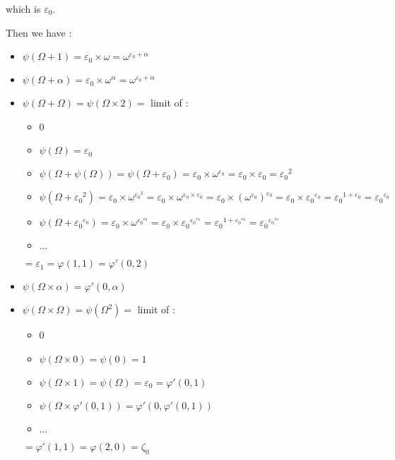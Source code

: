 \documentclass[10pt]{article}
\begin{document}
which is \( \varepsilon_0 \).

Then we have : 

\begin{itemize}
     \setlength{\itemsep}{1pt}
     \setlength{\parskip}{0pt}
     \setlength{\parsep}{0pt}

\item \( \psi(\Omega+1) = \varepsilon_0 \times \omega = \omega^{\varepsilon_0+\alpha} \)

\item \( \psi(\Omega+\alpha) = \varepsilon_0 \times \omega^\alpha = \omega^{\varepsilon_0+\alpha} \)

\item \( \psi(\Omega+\Omega) = \psi(\Omega \times 2) = \) limit of : 
   \begin{itemize}
     \setlength{\itemsep}{1pt}
     \setlength{\parskip}{0pt}
     \setlength{\parsep}{0pt}
   \item 0
   \item \( \psi(\Omega) = \varepsilon_0 \)
   \item \( \psi(\Omega+\psi(\Omega)) = \psi(\Omega+\varepsilon_0) = \varepsilon_0 \times \omega^{\varepsilon_0} = \varepsilon_0 \times \varepsilon_0 = {\varepsilon_0}^2 \)
   \item \( \psi(\Omega+{\varepsilon_0}^2) = \varepsilon_0 \times \omega^{{\varepsilon_0}^2} = \varepsilon_0 \times \omega^{\varepsilon_0 \times \varepsilon_0} = \varepsilon_0 \times (\omega^{\varepsilon_0})^{\varepsilon_0} = \varepsilon_0 \times {\varepsilon_0}^{\varepsilon_0} = {\varepsilon_0}^{1+\varepsilon_0} = {\varepsilon_0}^{\varepsilon_0} \)
   \item \( \psi(\Omega+{\varepsilon_0}^{\varepsilon_0}) = \varepsilon_0 \times \omega^{{\varepsilon_0}^{\varepsilon_0}} = \varepsilon_0 \times {\varepsilon_0}^{{\varepsilon_0}^{\varepsilon_0}} = {\varepsilon_0}^{1+{\varepsilon_0}^{\varepsilon_0}} = {\varepsilon_0}^{{\varepsilon_0}^{\varepsilon_0}} \)
   \item \( \ldots \)
   \end{itemize}
   \( = \varepsilon_1 = \varphi(1,1) = \varphi'(0,2) \)

\item \( \psi(\Omega \times \alpha) = \varphi'(0,\alpha) \)

\item \( \psi(\Omega \times \Omega) = \psi(\Omega^2) = \) limit of : 
   \begin{itemize}
     \setlength{\itemsep}{1pt}
     \setlength{\parskip}{0pt}
     \setlength{\parsep}{0pt}
   \item 0
   \item \( \psi(\Omega \times 0) = \psi(0) = 1 \)
   \item \( \psi(\Omega \times 1) = \psi(\Omega) = \varepsilon_0 = \varphi'(0,1) \)
   \item \( \psi(\Omega \times \varphi'(0,1)) = \varphi'(0,\varphi'(0,1)) \)
   \item \( \ldots \)
   \end{itemize}
   \( = \varphi'(1,1) = \varphi(2,0) = \zeta_0 \)


\end{itemize}
\end{document}
